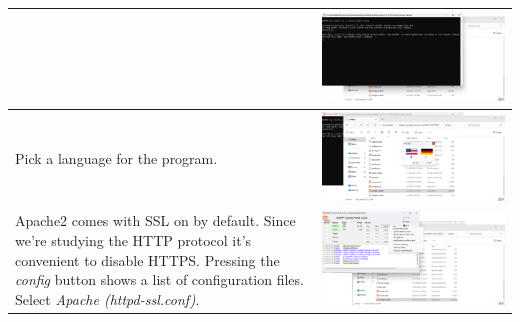 \documentclass[11pt,a4paper]{report}
\begin{document}
\begin{flushleft}
\begin{center}
\begin{longtable}{ m{5cm} l }
                        & \includegraphics[scale=0.303,valign=c]{install_xampp13} \\
                        \hline
                        Pick a language for the program.
                        & \includegraphics[scale=0.303,valign=c]{install_xampp14} \\
                        \hline
                        Apache2 comes with SSL on by default. Since we're studying the HTTP protocol it's convenient to disable HTTPS. Pressing the \textit{config} button shows a list of configuration files. Select \textit{Apache (httpd-ssl.conf)}.
                        & \includegraphics[scale=0.285,valign=c]{install_xampp15} \\

\end{longtable}
\end{center}
\end{flushleft}
\end{document}
